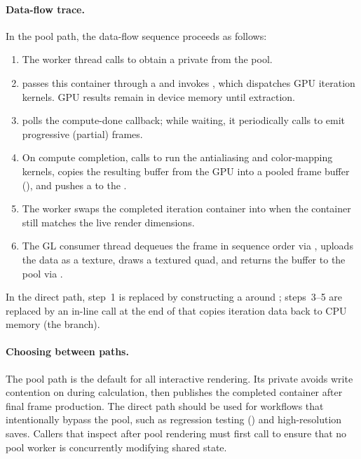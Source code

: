 \paragraph{Data-flow trace.}
In the pool path, the data-flow sequence proceeds as follows:
\begin{enumerate}
  \item The worker thread calls  to obtain a
        private  from the pool.
  \item {} passes this container through a
         and invokes , which
        dispatches GPU iteration kernels.  GPU results remain in
        device memory until extraction.
  \item {} polls the
        compute-done callback; while waiting, it periodically
        calls  to emit
        progressive (partial) frames.
  \item On compute completion, 
        calls  to run the antialiasing and
        color-mapping kernels, copies the resulting 
        buffer from the GPU into a pooled frame buffer
        (), and pushes a
         to the .
  \item The worker swaps the completed iteration container into
         when the container still matches the live render
        dimensions.
  \item The GL consumer thread dequeues the frame in sequence
        order via , uploads the
         data as a  texture, draws
        a textured quad, and returns the buffer to the pool via
        .
\end{enumerate}
In the direct path, step~1 is replaced by constructing a
 around ; steps~3--5 are
replaced by an in-line  call at the end of
 that copies iteration data back to
CPU memory (the  branch).

\paragraph{Choosing between paths.}
The pool path is the default for all interactive rendering.  Its
private  avoids write contention on
 during calculation, then publishes the completed
container after final frame production.  The direct path should be used for
workflows that intentionally bypass the pool, such as regression testing
() and high-resolution saves.  Callers that inspect
 after pool rendering must first call  to
ensure that no pool worker is concurrently modifying shared state.

